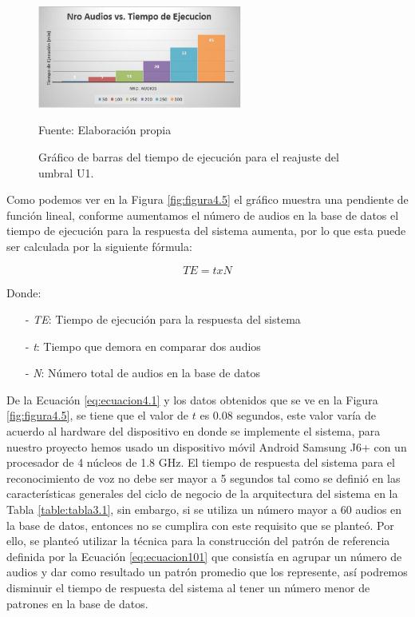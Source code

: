 \begin{figure}[H]
\captionsetup{justification=centering}
\begin{center}
\includegraphics[width=0.6\textwidth]{Imagenes/Cap4/image006}
\end{center}
\begin{center}
\vskip -0.5cm
\caption{\small{Gráfico de barras del tiempo de ejecución para el reajuste del umbral U1.}}
\label{fig:figura4.6}
{\small{Fuente: Elaboración propia}}
\end{center}
\end{figure}

\vskip -0.5cm
Como podemos ver en la Figura \ref{fig:figura4.5} el gráfico muestra una pendiente de función lineal, conforme aumentamos el número de audios en la base de datos el tiempo de ejecución para la respuesta del sistema aumenta, por lo que esta puede ser calculada por la siguiente fórmula:

\begin{equation}
\label{eq:ecuacion4.1}
TE = t x N
\end{equation}

Donde:
\begin{enumerate}
\item[-]\textit{TE}: Tiempo de ejecución para la respuesta del sistema
\item[-]\textit{t}: Tiempo que demora en comparar dos audios
\item[-]\textit{N}: Número total de audios en la base de datos
\end{enumerate}

\vskip 0.5cm
De la Ecuación \eqref{eq:ecuacion4.1} y los datos obtenidos que se ve en la Figura \ref{fig:figura4.5}, se tiene que el valor de $t$ es 0.08 segundos, este valor varía de acuerdo al hardware del dispositivo en donde se implemente el sistema, para nuestro proyecto hemos usado un dispositivo móvil Android Samsung J6+ con un procesador de 4 núcleos de 1.8 GHz.
\vskip 0.5cm
El tiempo de respuesta del sistema para el reconocimiento de voz no debe ser mayor a 5 segundos tal como se definió en las características generales del ciclo de negocio de la arquitectura del sistema en la Tabla \ref{table:tabla3.1}, sin embargo, si se utiliza un número mayor a 60 audios en la base de datos, entonces no se cumplira con este requisito que se planteó.
\vskip 0.5cm
Por ello, se planteó utilizar la técnica para la construcción del patrón de referencia definida por la Ecuación \eqref{eq:ecuacion101} que consistía en agrupar un número de audios y dar como resultado un patrón promedio que los represente, así podremos disminuir el tiempo de respuesta del sistema al tener un número menor de patrones en la base de datos.


